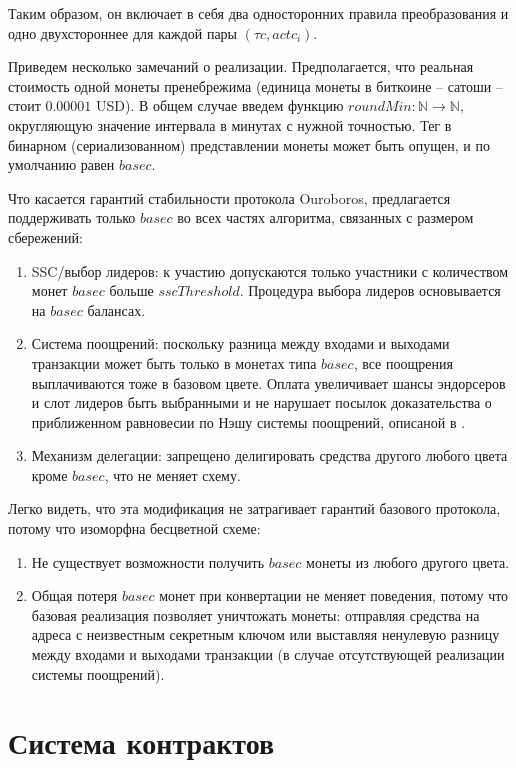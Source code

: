 \documentclass[specification,annotation]{itmo-student-thesis}
\begin{document}
Таким образом, он включает в себя два односторонних правила
преобразования и одно двухстороннее для каждой пары $(\tau c, actc_i)$.

Приведем несколько замечаний о реализации. Предполагается, что
реальная стоимость одной монеты пренебрежима (единица монеты в
биткоине -- сатоши -- стоит $0.00001$ USD). В общем случае введем
функцию $roundMin : \mathbb{N} \rightarrow \mathbb{N}$, округляющую
значение интервала в минутах с нужной точностью. Тег в бинарном
(сериализованном) представлении монеты может быть опущен, и по
умолчанию равен $basec$.

Что касается гарантий стабильности протокола Ouroboros, предлагается
поддерживать только $basec$ во всех частях алгоритма, связанных с
размером сбережений:

\begin{enumerate}
\item SSC/выбор лидеров: к участию допускаются только участники с
  количеством монет $basec$ больше $sscThreshold$. Процедура выбора
  лидеров основывается на $basec$ балансах.
\item Система поощрений: поскольку разница между входами и выходами
  транзакции может быть только в монетах типа $basec$, все поощрения
  выплачиваются тоже в базовом цвете. Оплата увеличивает шансы
  эндорсеров и слот лидеров быть выбранными и не нарушает посылок
  доказательства о приближенном равновесии по Нэшу системы поощрений,
  описаной в \cite{ouroboros}.
\item Механизм делегации: запрещено делигировать средства другого
  любого цвета кроме $basec$, что не меняет схему.
\end{enumerate}

Легко видеть, что эта модификация не затрагивает гарантий базового
протокола, потому что изоморфна бесцветной схеме:

\begin{enumerate}
\item Не существует возможности получить $basec$ монеты из любого
  другого цвета.
\item Общая потеря $basec$ монет при конвертации не меняет поведения,
  потому что базовая реализация позволяет уничтожать монеты: отправляя
  средства на адреса с неизвестным секретным ключом или выставляя
  ненулевую разницу между входами и выходами транзакции (в случае
  отсутствующей реализации системы поощрений).
\end{enumerate}

\section{Система контрактов}
\end{document}
